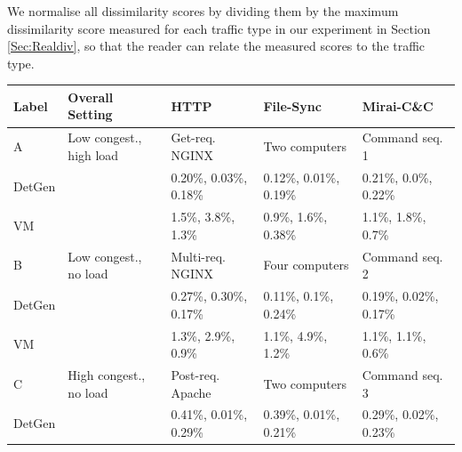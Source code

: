 \documentclass[sigconf]{acmart}
\begin{document}
We normalise all dissimilarity scores by dividing them by the maximum dissimilarity score measured for each traffic type in our experiment in Section \ref{Sec:Realdiv}, so that the reader can relate the measured scores to the traffic type.



\begin{table}
\centering
\begin{tabular}{p{1cm}|p{3.2cm}|p{2.7cm}|p{2.7cm}|p{2.7cm}}
Label &Overall Setting&HTTP&File-Sync & Mirai-C\&C\\ \hline
A&Low congest., high load& Get-req. NGINX&  Two computers & Command seq. 1 \\ \hline
DetGen &&\footnotesize \textcolor{myred}{0.20\%}, \textcolor{mygreen}{0.03\%}, \textcolor{myblue}{0.18\%}&
 \footnotesize \textcolor{myred}{0.12\%}, \textcolor{mygreen}{0.01\%}, \textcolor{myblue}{0.19\%}&
 \footnotesize \textcolor{myred}{0.21\%}, \textcolor{mygreen}{0.0\%}, \textcolor{myblue}{0.22\%}\\ \hline \hline
VM & &\footnotesize \textcolor{myred}{1.5\%}, \textcolor{mygreen}{3.8\%}, \textcolor{myblue}{1.3\%}&
 \footnotesize \textcolor{myred}{0.9\%}, \textcolor{mygreen}{1.6\%}, \textcolor{myblue}{0.38\%}&
 \footnotesize \textcolor{myred}{1.1\%}, \textcolor{mygreen}{1.8\%}, \textcolor{myblue}{0.7\%}\\ \hline \hline
B& Low congest., no load &Multi-req. NGINX & Four computers & Command seq. 2\\ \hline
DetGen &&\footnotesize \textcolor{myred}{0.27\%}, \textcolor{mygreen}{0.30\%}, \textcolor{myblue}{0.17\%}&
\footnotesize \textcolor{myred}{0.11\%}, \textcolor{mygreen}{0.1\%}, \textcolor{myblue}{0.24\%}&
\footnotesize \textcolor{myred}{0.19\%}, \textcolor{mygreen}{0.02\%}, \textcolor{myblue}{0.17\%}\\ \hline \hline
VM & &\footnotesize \textcolor{myred}{1.3\%}, \textcolor{mygreen}{2.9\%}, \textcolor{myblue}{0.9\%}&
 \footnotesize \textcolor{myred}{1.1\%}, \textcolor{mygreen}{4.9\%}, \textcolor{myblue}{1.2\%}&
 \footnotesize \textcolor{myred}{1.1\%}, \textcolor{mygreen}{1.1\%}, \textcolor{myblue}{0.6\%}\\ \hline \hline
C& High congest., no load & Post-req. Apache &Two computers & Command seq. 3\\ \hline
DetGen &&\footnotesize \textcolor{myred}{0.41\%}, \textcolor{mygreen}{0.01\%}, \textcolor{myblue}{0.29\%}&
 \footnotesize \textcolor{myred}{0.39\%}, \textcolor{mygreen}{0.01\%}, \textcolor{myblue}{0.21\%}&
 \footnotesize \textcolor{myred}{0.29\%}, \textcolor{mygreen}{0.02\%}, \textcolor{myblue}{0.23\%}\\ \hline \hline

\end{tabular}
\end{table}
\end{document}
